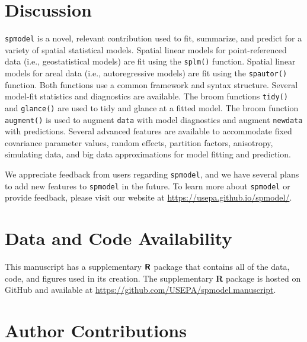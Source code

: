 \documentclass[10pt,letterpaper]{article}
\begin{document}
\hypertarget{sec:discussion}{%
\section{Discussion}\label{sec:discussion}}

\texttt{spmodel} is a novel, relevant contribution used to fit,
summarize, and predict for a variety of spatial statistical models.
Spatial linear models for point-referenced data (i.e., geostatistical
models) are fit using the \texttt{splm()} function. Spatial linear
models for areal data (i.e., autoregressive models) are fit using the
\texttt{spautor()} function. Both functions use a common framework and
syntax structure. Several model-fit statistics and diagnostics are
available. The broom functions \texttt{tidy()} and \texttt{glance()} are
used to tidy and glance at a fitted model. The broom function
\texttt{augment()} is used to augment \texttt{data} with model
diagnostics and augment \texttt{newdata} with predictions. Several
advanced features are available to accommodate fixed covariance
parameter values, random effects, partition factors, anisotropy,
simulating data, and big data approximations for model fitting and
prediction.

We appreciate feedback from users regarding \texttt{spmodel}, and we
have several plans to add new features to \texttt{spmodel} in the
future. To learn more about \texttt{spmodel} or provide feedback, please
visit our website at \url{https://usepa.github.io/spmodel/}.

\hypertarget{data-and-code-availability}{%
\section*{Data and Code Availability}\label{data-and-code-availability}}

This manuscript has a supplementary \(\textbf{\textsf{R}}\) package that
contains all of the data, code, and figures used in its creation. The
supplementary \textbf{\textsf{R}} package is hosted on GitHub and
available at \url{https://github.com/USEPA/spmodel.manuscript}.

\hypertarget{author-contributions}{%
\section*{Author Contributions}\label{author-contributions}}
\end{document}
